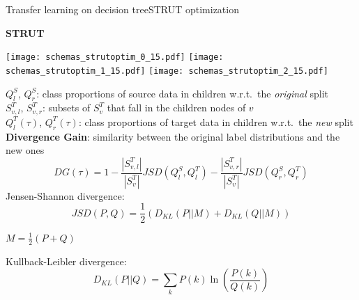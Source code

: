 \begin{frame}{Transfer learning on decision tree}{STRUT optimization}

\begin{minipage}[t]{0.4\linewidth}
    \vspace{0pt}
    
    \centering
    \textbf{STRUT}\\

    \renewcommand{\ratio}{1.0}
    \begin{overprint}
        \texttt{[image: schemas\_strutoptim\_0\_15.pdf]}
        \texttt{[image: schemas\_strutoptim\_1\_15.pdf]}
        \texttt{[image: schemas\_strutoptim\_2\_15.pdf]}
    \end{overprint}
\end{minipage}\hfill
\begin{minipage}[t]{0.55\linewidth}
    \vspace{0pt}
    \pause \pause
    $Q_{l}^{S}$, $Q_{r}^{S}$: class proportions of source data in children w.r.t.\ the \emph{original} split\\
    \pause
    $S_{v,l}^{T}$, $S_{v,r}^{T}$: subsets of $S_{v}^{T}$ that fall in the children nodes of $v$\\
    $Q_{l}^{T}(\tau)$, $Q_{r}^{T}(\tau)$: class proportions of target data in children w.r.t.\ the \emph{new} split\\
    \pause
    \textbf{Divergence Gain}: similarity between the original label distributions and the new ones
    $$
    DG\left(\tau\right) = 1 - \frac{|S_{v,l}^{T}|}{|S_{v}^{T}|}JSD(Q_{l}^{S}, Q_{l}^{T})
    - \frac{|S_{v,r}^{T}|}{|S_{v}^{T}|}JSD(Q_{r}^{S}, Q_{r}^{T})
    $$
    Jensen-Shannon divergence:
    $$JSD(P, Q) = \frac{1}{2}\left(D_{KL}(P||M) + D_{KL}(Q||M)\right) $$
    \begin{flushright}
    $M = \frac{1}{2} \left(P +Q\right) $
    \end{flushright}
    Kullback-Leibler divergence:
    $$D_{KL}(P||Q) = \sum_{k}{P(k)\ln\left(\frac{P(k)}{Q(k)}\right)}$$


\end{minipage}

\end{frame}

